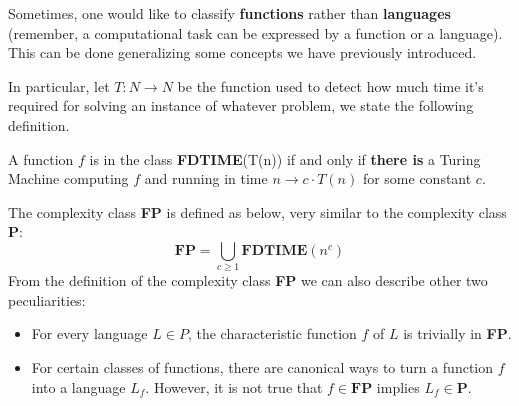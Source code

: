 Sometimes, one would like to classify \textbf{functions} rather than \textbf{languages} (remember, a computational task can be expressed by a function or a
language). This can be done generalizing some concepts we have previously introduced.

In particular, let $T: N \rightarrow N$ be the function used to detect how much time it's required for solving an instance of whatever problem, we state the
following definition.
\begin{definition}
    A function $f$ is in the class \textbf{FDTIME}(T(n)) if and only if \textbf{there is} a Turing Machine computing $f$ and running in time $n \rightarrow c 
    \cdot T(n)$ for some constant $c$.
\end{definition}
The complexity class \textbf{FP} is defined as below, very similar to the complexity class \textbf{P}:
$$ \textbf{FP} = \bigcup_{c \geq 1} \textbf{FDTIME}(n^c)$$
From the definition of the complexity class \textbf{FP} we can also describe other two peculiarities:
\begin{itemize}
    \renewcommand{\labelitemi}{-}
    \item For every language $L \in P$, the characteristic function $f$ of $L$ is trivially in \textbf{FP}.
    \item For certain classes of functions, there are canonical ways to turn a function $f$ into a language $L_f$. However, it is not true that $f \in \textbf{FP}$ implies $L_f \in \textbf{P}$.
\end{itemize}
